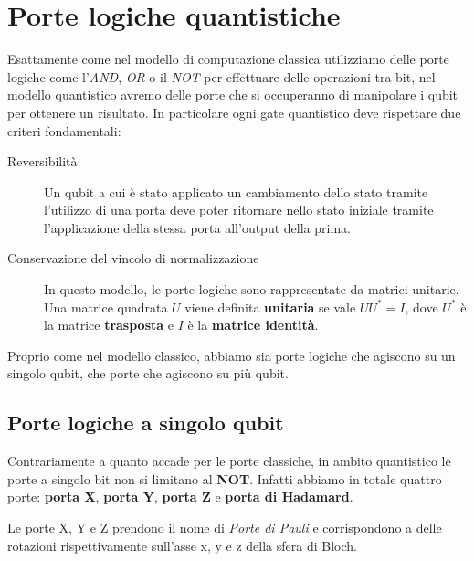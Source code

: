 \section{Porte logiche quantistiche}
Esattamente come nel modello di computazione classica utilizziamo delle porte logiche come l'\textit{AND}, \textit{OR} o il \textit{NOT} per effettuare delle operazioni tra bit, nel modello quantistico avremo delle porte che si occuperanno di manipolare i qubit per ottenere un risultato. In particolare ogni gate quantistico deve rispettare due criteri fondamentali:

\begin{description}
  \item[Reversibilità] Un qubit a cui è stato applicato un cambiamento dello stato tramite l'utilizzo di una porta deve poter ritornare nello stato iniziale tramite l'applicazione della stessa porta all'output della prima.
  \item [Conservazione del vincolo di normalizzazione] In questo modello, le porte logiche sono rappresentate da matrici unitarie. Una matrice quadrata \( U \) viene definita \textbf{unitaria} se vale \( UU^* = I \), dove \( U^* \) è la matrice \textbf{trasposta} e \( I \) è la \textbf{matrice identità}.
\end{description}

Proprio come nel modello classico, abbiamo sia porte logiche che agiscono su un singolo qubit, che porte che agiscono su più qubit.

\subsection{Porte logiche a singolo qubit}
Contrariamente a quanto accade per le porte classiche, in ambito quantistico le porte a singolo bit non si limitano al \textbf{NOT}. Infatti abbiamo in totale quattro porte: \textbf{porta X}, \textbf{porta Y}, \textbf{porta Z} e \textbf{porta di Hadamard}. 

Le porte X, Y e Z prendono il nome di \textit{Porte di Pauli} e corrispondono a delle rotazioni rispettivamente sull'asse x, y e z della sfera di Bloch.

